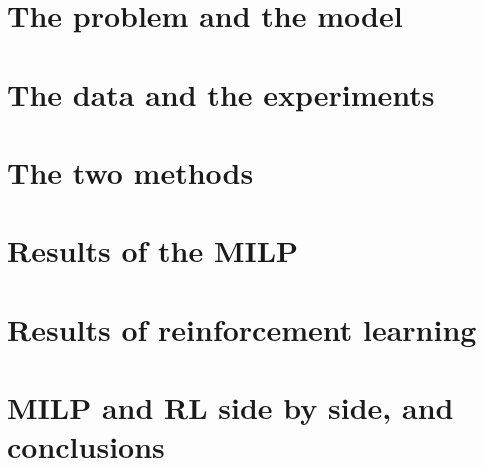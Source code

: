 \documentclass[11pt,a4paper]{article}
\renewcommand{\_}{\origunderscore\allowbreak}
\begin{document}

\part{The problem and the model}

\part{The data and the experiments}

\part{The two methods}

\part{Results of the MILP}

\part{Results of reinforcement learning}

\part{MILP and RL side by side, and conclusions}

\end{document}

